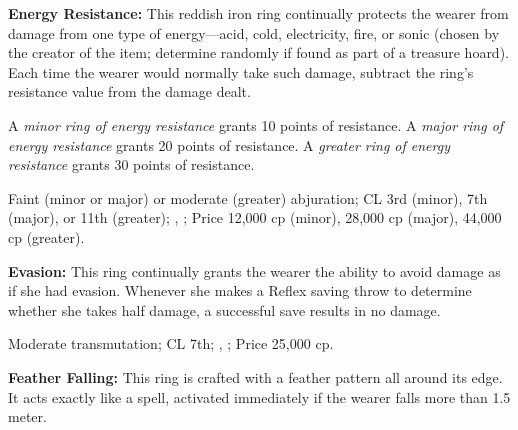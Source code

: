 




\textbf{Energy Resistance:} This reddish iron ring continually protects the wearer from damage from one type of energy---acid, cold, electricity, fire, or sonic (chosen by the creator of the item; determine randomly if found as part of a treasure hoard). Each time the wearer would normally take such damage, subtract the ring's resistance value from the damage dealt.

A \emph{minor ring of energy resistance} grants 10 points of resistance. A \emph{major ring of energy resistance} grants 20 points of resistance. A \emph{greater ring of energy resistance} grants 30 points of resistance.

Faint (minor or major) or moderate (greater) abjuration; CL 3rd (minor), 7th (major), or 11th (greater); , ; Price 12,000 cp (minor), 28,000 cp (major), 44,000 cp (greater).


\textbf{Evasion:} This ring continually grants the wearer the ability to avoid damage as if she had evasion. Whenever she makes a Reflex saving throw to determine whether she takes half damage, a successful save results in no damage.

Moderate transmutation; CL 7th; , ; Price 25,000 cp.


\textbf{Feather Falling:} This ring is crafted with a feather pattern all around its edge. It acts exactly like a  spell, activated immediately if the wearer falls more than 1.5 meter.

